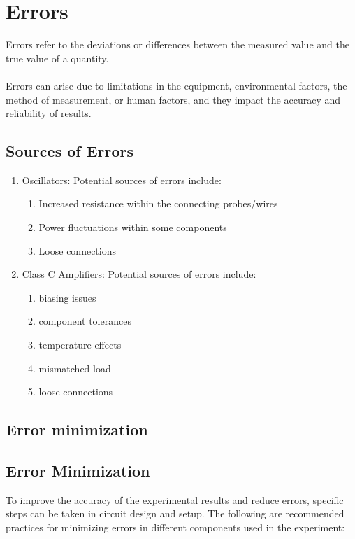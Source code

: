 \documentclass[12pt,a4paper]{report}
\begin{document}
\chapter{Errors}
Errors refer to the deviations or differences between the measured value and the true value of a quantity.\\
\\
Errors can arise due to limitations in the equipment, environmental factors, the method of measurement, or human factors, and they impact the accuracy and reliability of results. 
\section{Sources of Errors}
\begin{enumerate}
    \item Oscillators: Potential sources of errors include:
    \begin{enumerate}
        \item Increased resistance within the connecting probes/wires
        \item Power fluctuations within some components
        \item Loose connections
    \end{enumerate}
    \item Class C Amplifiers: Potential sources of errors include:
    \begin{enumerate}
        \item biasing issues
        \item component tolerances
        \item temperature effects
        \item mismatched load
        \item loose connections
    \end{enumerate}
\end{enumerate}
\section{Error minimization}
\section{Error Minimization}

To improve the accuracy of the experimental results and reduce errors, specific steps can be taken in circuit design and setup. The following are recommended practices for minimizing errors in different components used in the experiment:
\end{document}

